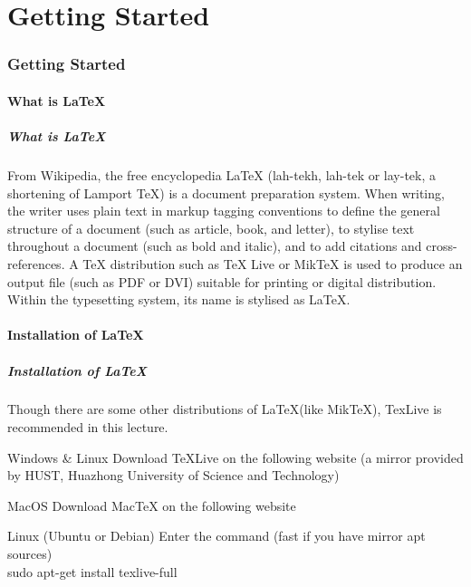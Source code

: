 \part{Getting Started}

\section{Getting Started}
\begin{frame}
\end{frame}

\subsection{What is \LaTeX}

\begin{frame}
	\frametitle{What is \LaTeX}
	\begin{block}{From Wikipedia, the free encyclopedia}
		LaTeX (lah-tekh, lah-tek or lay-tek, a shortening of Lamport TeX) is a document preparation system. When writing, the writer uses plain text in markup tagging conventions to define the general structure of a document (such as article, book, and letter), to stylise text throughout a document (such as bold and italic), and to add citations and cross-references. A TeX distribution such as TeX Live or MikTeX is used to produce an output file (such as PDF or DVI) suitable for printing or digital distribution. Within the typesetting system, its name is stylised as \LaTeX.
	\end{block}
\end{frame}

\subsection{Installation of \LaTeX}
\begin{frame}
	\frametitle{Installation of \LaTeX}
	Though there are some other distributions of \LaTeX (like MikTeX), TexLive is recommended in this lecture.
	\begin{block}{Windows \& Linux}
		Download TeXLive on the following website (a mirror provided by HUST, Huazhong University of Science and Technology) \\
	\end{block}
	\begin{block}{MacOS}
		Download MacTeX on the following website\\
	\end{block}
	\begin{block}{Linux (Ubuntu or Debian)}
		Enter the command (fast if you have mirror apt sources) \\
		\alert{sudo apt-get install texlive-full}
	\end{block}
\end{frame}

